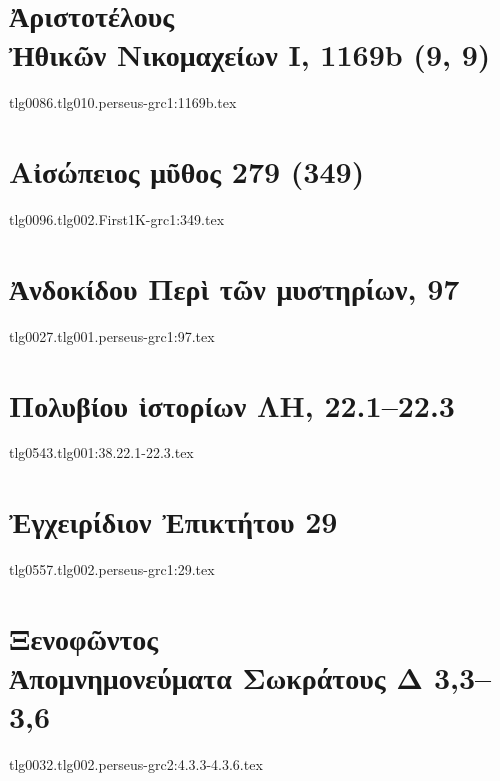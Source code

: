 \documentclass[a4paper,12pt,twoside]{report}
\begin{document}
\chapter[Ἀριστοτέλους Ἠθικῶν Νικομαχείων Ι]{\textgreek[variant=ancient]{Ἀριστοτέλους \\Ἠθικῶν Νικομαχείων Ι,} 1169b (9, 9)}
{tlg0086.tlg010.perseus-grc1:1169b.tex}

\chapter[Αἰσώπειος μῦθος 279]{\textgreek[variant=ancient]{Αἰσώπειος μῦθος} 279 (349)}
{tlg0096.tlg002.First1K-grc1:349.tex}

\chapter[Ἀνδοκίδου Περὶ τῶν μυστηρίων]{\textgreek[variant=ancient]{Ἀνδοκίδου Περὶ τῶν μυστηρίων,} 97}
{tlg0027.tlg001.perseus-grc1:97.tex}



\chapter[Πολυβίου Ἱστορίων ΛΗ]{\textgreek[variant=ancient]{Πολυβίου ἱστορίων ΛΗ,} 22.1–22.3}
{tlg0543.tlg001:38.22.1-22.3.tex}

\chapter[Ἐγχειρίδιον Ἐπικτήτου 29]{\textgreek[variant=ancient]{Ἐγχειρίδιον Ἐπικτήτου} 29}
{tlg0557.tlg002.perseus-grc1:29.tex}

\chapter[Ξενοφῶντος Ἀπομνημονεύματα Σωκράτους]{\textgreek[variant=ancient]{Ξενοφῶντος \\Ἀπομνημονεύματα Σωκράτους Δ} 3,3–3,6}
{tlg0032.tlg002.perseus-grc2:4.3.3-4.3.6.tex}
\end{document}
